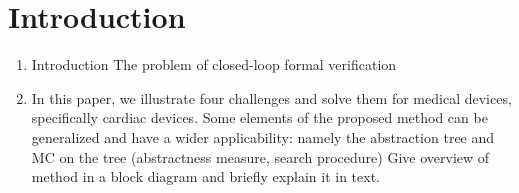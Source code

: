 \section{Introduction}
\label{introduction}
\begin{enumerate}
\item Introduction
\subitem The problem of closed-loop formal verification
\item In this paper, we illustrate four challenges and solve them for medical devices, specifically cardiac devices.
\subitem Some elements of the proposed method can be generalized and have a wider applicability: namely the abstraction tree and MC on the tree (abstractness measure, search procedure)
\subitem Give overview of method in a block diagram and briefly explain it in text.
\end{enumerate}

